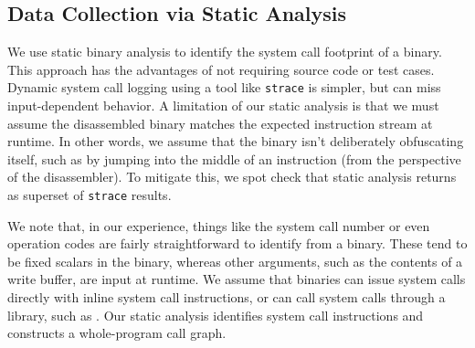 \subsection{Data Collection via Static Analysis}
\label{sec:measure:analysis}

We use static binary analysis to identify the system call footprint of a binary.  This approach has the advantages
of not requiring source code or test cases.  Dynamic system call logging using a tool like {\tt strace} is simpler,
but can miss input-dependent behavior.  A limitation of our static analysis is that we must assume the disassembled binary
matches the expected instruction stream at runtime.  In other words, we assume that the binary isn't deliberately obfuscating
itself, such as by jumping into the middle of an instruction (from the perspective of the disassembler).
To mitigate this, we spot check that static analysis returns as superset of {\tt strace} results.

We note that, in our experience, things like the system call number or even operation codes are fairly straightforward
to identify from a binary.  These tend to be fixed scalars in the binary, whereas other arguments, such as the contents of a write buffer,
are input at runtime.
We assume that binaries can issue system calls directly with inline system call instructions, or can call system calls through a library, such as \libc{}.
Our static analysis identifies system call instructions and constructs a whole-program call graph.

